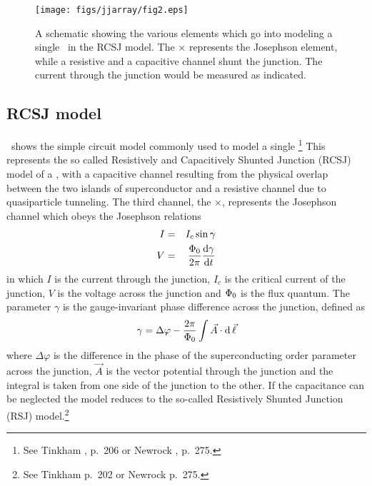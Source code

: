 %
%
\begin{figure}[p]
\texttt{[image: figs/jjarray/fig2.eps]}
\caption[Circuit schematic of single \jjnoun.]{A schematic showing the 
various elements which go into 
modeling a single \jjnoun\ in the RCSJ model. 
The $\times$ represents the Josephson element,
while a resistive and a capacitive channel shunt the junction. The current
through the junction would be measured as indicated.} 
\label{fig:single_junction_sketch}
\end{figure}

\subsection{RCSJ model}

\ shows the simple circuit 
model commonly used to model a single \jjnoun\footnote{See Tinkham
\cite{tinkham}, p.~206 
or Newrock \etal \cite{newrock_ssp_54_263_2000}, p.~275.}
This represents
the so called Resistively and Capacitively Shunted Junction (RCSJ) model
of a \jjnoun,  
with a capacitive channel resulting from the physical overlap between the 
two islands of superconductor and a resistive channel due to quasiparticle
tunneling. The third channel, the $\times$, represents the Josephson
channel which obeys the Josephson relations
\cite{josephson_pl_1_252_1962}
%
%
\begin{eqnarray}
I & =&  I_c \sin\gamma \\
V & = & {\Phi_0\over 2\pi}{\mathrm{d}\gamma\over\mathrm{d} t}
\end{eqnarray}
%
in which $I$ is the current through the junction, $I_c$ is the critical
current of the junction,  $V$ is the voltage across the junction
and $\Phi_0$ is the flux quantum.
The parameter $\gamma$ is the gauge-invariant phase difference across
the junction, defined as
%
\begin{equation}
\gamma = \Delta\varphi - 
       {2\pi\over\Phi_0}\int \vec A \cdot \mathrm{d}\,\vec\ell
\end{equation}
% 
where $\Delta\varphi$ is the difference in the phase of the superconducting
order parameter across the junction, $\vec{A}$ is the vector potential
through the junction and the integral is taken from one side of the 
junction to the other.
If the capacitance can be neglected
the model reduces to the so-called Resistively
Shunted Junction (RSJ) model.\footnote{See Tinkham \cite{tinkham} p.~202 
or Newrock \etal \cite{newrock_ssp_54_263_2000} p.~275.}%
%
%  


